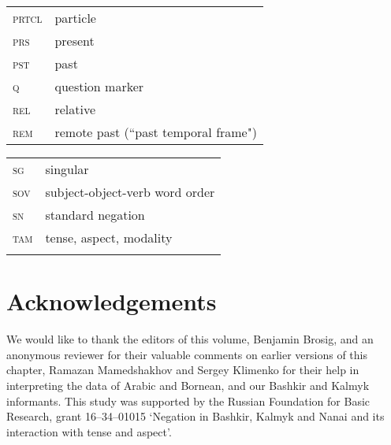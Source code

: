 \documentclass[output=paper]{langsci/langscibook}
\begin{document}
\begin{tabularx}{.45\textwidth}{lQ}
    \textsc{prtcl} & particle\\
    \textsc{prs} & present\\
    \textsc{pst} & past\\
    \textsc{q} & question marker\\
    \textsc{rel} & relative\\
    \textsc{rem} & remote past (``past temporal frame")\\
\end{tabularx}
\begin{tabularx}{.45\textwidth}{lQ}
    \textsc{sg} & singular\\
    \textsc{sov} & subject-object-verb word order\\
    \textsc{sn} & standard negation\\
    \textsc{tam} & tense, aspect, modality\\
    \\
\end{tabularx}


\section*{Acknowledgements}
We would like to thank the editors of this volume, Benjamin Brosig, and an anonymous reviewer for their valuable comments on earlier versions of this chapter, Ramazan Mamedshakhov and Sergey Klimenko for their help in interpreting the data of Arabic and Bornean, and our Bashkir and Kalmyk informants. This study was supported by the Russian Foundation for Basic Research, grant 16--34--01015 ‘Negation in Bashkir, Kalmyk and Nanai and its interaction with tense and aspect’.



{\sloppy\printbibliography[heading=subbibliography,notkeyword=this]}
\end{document}
